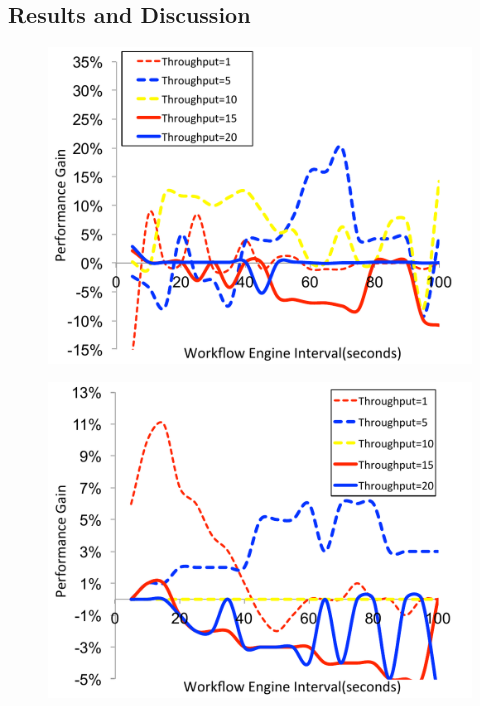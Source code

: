 \subsection{Results and Discussion}

\begin{figure}[!htb]
\centering
 \includegraphics[width=0.9\linewidth]{figure/MAX-MIN-Broadband.pdf}
  \label{fig:MAX-MIN-Broadband}
  \vspace{-10pt}
\end{figure}

\begin{figure}[!htb]
\centering
 \includegraphics[width=0.9\linewidth]{figure/MAX-MIN-CyberShake.pdf}
  \label{fig:MAX-MIN-CyberShake}
  \vspace{-10pt}
\end{figure}


